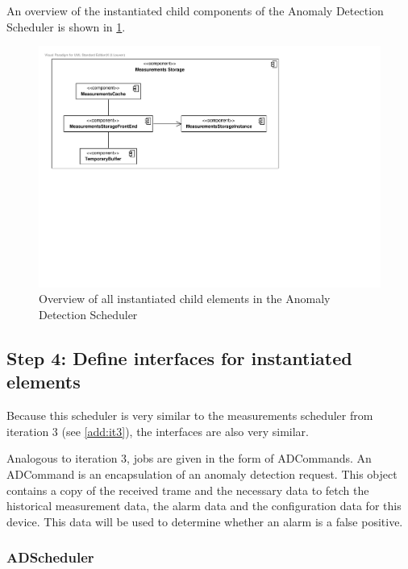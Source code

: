 \npar An overview of the instantiated child components of the Anomaly Detection
Scheduler is shown in \ref{fig:it5/elements}.

\begin{figure}[H]
	\begin{centering}
		\includegraphics[width=\textwidth]{figs/add-it4-elements.pdf}
		\caption{Overview of all instantiated child elements in the Anomaly
		Detection Scheduler}
		\label{fig:it5/elements}
	\end{centering}
\end{figure}

\subsection{Step 4: Define interfaces for instantiated elements}
\label{add:it5/interfaces}

\npar Because this scheduler is very similar to the measurements scheduler from
iteration 3 (see \ref{add:it3}), the interfaces are also very similar. 

\npar Analogous to iteration 3, jobs are given in the form of ADCommands. An
ADCommand is an encapsulation of an anomaly detection request. This object
contains a copy of the received trame and the necessary data to fetch the
historical measurement data, the alarm data and the configuration data for this
device. This data will be used to determine whether an alarm is a false positive. 

\subsubsection{ADScheduler}

